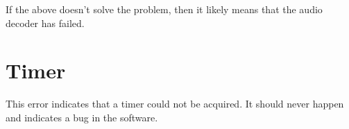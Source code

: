 \par\medskip

If the above doesn't solve the problem, then it likely means that the audio
decoder has failed.

\section{Timer}

 

\par\bigskip

This error indicates that a timer could not be acquired.  It should
never happen and indicates a bug in the software.

